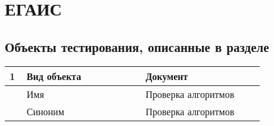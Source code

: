 \section{ЕГАИС}
\subsection{Объекты тестирования, описанные в разделе}

\begin{longtable}{p{0.05\linewidth}p{0.4\linewidth}p{0.4\linewidth}}
    \hline
    1 & Вид объекта & Документ \\
    \hline
    & Имя & Проверка алгоритмов \\
    \hline
    & Синоним  & Проверка алгоритмов \\
    \hline

    \bottomrule %
\end{longtable}